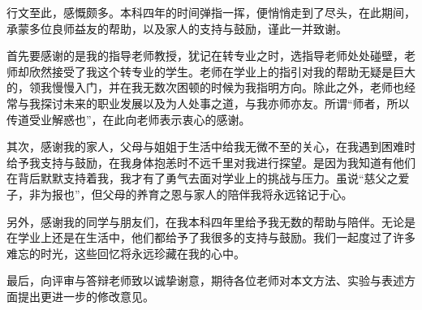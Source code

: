 
\begin{acknowledgements}
    行文至此，感慨颇多。本科四年的时间弹指一挥，便悄悄走到了尽头，在此期间，承蒙多位良师益友的帮助，以及家人的支持与鼓励，谨此一并致谢。
    
    首先要感谢的是我的指导老师教授，犹记在转专业之时，选指导老师处处碰壁，老师却欣然接受了我这个转专业的学生。老师在学业上的指引对我的帮助无疑是巨大的，领我慢慢入门，并在我无数次困顿的时候为我指明方向。除此之外，老师也经常与我探讨未来的职业发展以及为人处事之道，与我亦师亦友。所谓“师者，所以传道受业解惑也”，在此向老师表示衷心的感谢。
    
    其次，感谢我的家人，父母与姐姐于生活中给我无微不至的关心，在我遇到困难时给予我支持与鼓励，在我身体抱恙时不远千里对我进行探望。是因为我知道有他们在背后默默支持着我，我才有了勇气去面对学业上的挑战与压力。虽说“慈父之爱子，非为报也”，但父母的养育之恩与家人的陪伴我将永远铭记于心。
    
    另外，感谢我的同学与朋友们，在我本科四年里给予我无数的帮助与陪伴。无论是在学业上还是在生活中，他们都给予了我很多的支持与鼓励。我们一起度过了许多难忘的时光，这些回忆将永远珍藏在我的心中。
    
    最后，向评审与答辩老师致以诚挚谢意，期待各位老师对本文方法、实验与表述方面提出更进一步的修改意见。
\end{acknowledgements}
